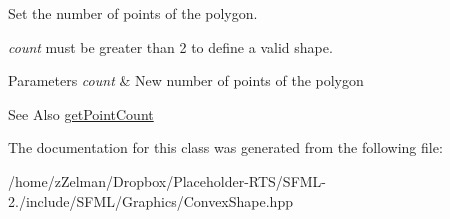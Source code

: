 Set the number of points of the polygon. 

{\itshape count} must be greater than 2 to define a valid shape.


\begin{DoxyParams}{Parameters}
{\em count} & New number of points of the polygon\\
\hline
\end{DoxyParams}
\begin{DoxySeeAlso}{See Also}
\hyperlink{classsf_1_1ConvexShape_af81b86134fe54f2d50d9fab0db065ef1}{get\-Point\-Count} 
\end{DoxySeeAlso}


The documentation for this class was generated from the following file\-:\begin{DoxyCompactItemize}
\item 
/home/z\-Zelman/\-Dropbox/\-Placeholder-\/\-R\-T\-S/\-S\-F\-M\-L-\/2./include/\-S\-F\-M\-L/\-Graphics/Convex\-Shape.\-hpp\end{DoxyCompactItemize}

